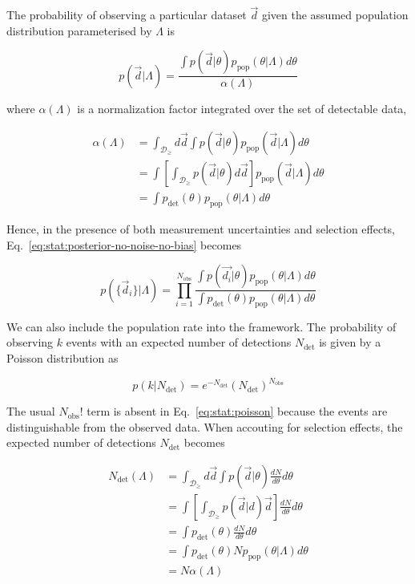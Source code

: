 \documentclass[%
preprint,
nofootinbib,
 amsmath,amssymb,
 aps,
]{revtex4-2}
\newcommand{\given}[2]{p( #1 | #2 )}
\newcommand{\ppop}[0]{p_{\text{pop}}}
\newcommand{\pdet}[0]{p_{\text{det}}}
\newcommand{\ndet}[0]{N_{\text{det}}}
\newcommand{\nobs}[0]{N_{\text{obs}}}
\begin{document}
The probability of observing a particular dataset $\vec{d}$ given the assumed population
distribution parameterised by $\Lambda$ is

\begin{equation}
	\given{\vec{d}}{\Lambda} =
	\frac{\int \given{\vec{d}}{\theta} \ppop(\theta | \Lambda ) d\theta}{\alpha(\Lambda)}
\end{equation}

where $\alpha(\Lambda)$ is a normalization factor integrated over the set of detectable data,

\begin{align}
	\alpha(\Lambda) & =
	\int_{\mathcal{D}_\geq} d\vec{d} \int \given{\vec{d}}{\theta} \ppop(\vec{d} | \Lambda ) d\theta                                     \\
	                & = \int \left[ \int_{\mathcal{D}_\geq} \given{\vec{d}}{\theta} d\vec{d} \right]  \ppop(\vec{d} | \Lambda ) d\theta \\
	\label{eq:stat:nalpha}
	                & = \int \pdet(\theta) \ppop(\theta | \Lambda ) d\theta
\end{align}

Hence, in the presence of both measurement uncertainties and selection effects,
Eq.~\eqref{eq:stat:posterior-no-noise-no-bias} becomes

\begin{equation}
	\given{\{ \vec{d}_i \}}{\Lambda} =
	\prod_{i=1}^{\nobs}
	\frac{\int \given{\vec{d_i}}{\theta} \ppop(\theta | \Lambda ) d\theta}{\int \pdet(\theta) \ppop(\theta | \Lambda ) d\theta}
\end{equation}

We can also include the population rate into the framework. The probability of observing $k$ events
with an expected number of detections $\ndet$ is given by a Poisson distribution as

\begin{equation}
	\label{eq:stat:poisson}
	\given{k}{\ndet} = e^{-\ndet}(\ndet)^{\nobs}
\end{equation}

The usual $\nobs !$ term is absent in Eq.~\eqref{eq:stat:poisson} because the events are
distinguishable from the observed data. When accouting for selection effects, the expected number
of detections $\ndet$ becomes

\begin{align}
	\ndet(\Lambda) & = \int_{\mathcal{D}_\geq}  d\vec{d} \int \given{\vec{d}}{\theta} \frac{dN}{d\theta} d\theta      \\
	               & = \int \left[ \int_{\mathcal{D}_\geq} \given{\vec{d}} d\vec{d} \right]\frac{dN}{d\theta} d\theta \\
	               & = \int \pdet(\theta)\frac{dN}{d\theta} d\theta                                                   \\
	               & = \int \pdet(\theta) N \ppop(\theta | \Lambda) d\theta                                           \\
	               & = N \alpha(\Lambda)
\end{align}
\end{document}
